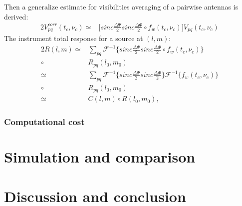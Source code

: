 Then a generalize estimate for visibilities averaging of a pairwise antennas is derived:
\begin{alignat*}{2}
 V_{pq}^{corr}(t_c, \nu_c)\simeq& \bigg[sinc\frac{\Delta \Psi}{2}sinc\frac{\Delta \Phi}{2}\circ f_{w}(t_c,\nu_c)\bigg]
			   V_{pq}(t_{c},\nu_{c})
\end{alignat*}
The  instrument total response for a source at $(l,m)$:
\begin{alignat*}{2}
R(l,m)\simeq& \sum_{pq}\mathcal{F}^{-1}\bigg\{sinc\frac{\Delta \Psi}{2}sinc\frac{\Delta \Phi}{2}\circ f_{w}(t_c,\nu_c)\bigg\}\\
	\circ& R_{pq}(l_0,m_0)\\
	\simeq& \sum_{pq}\mathcal{F}^{-1}\bigg\{sinc\frac{\Delta \Psi}{2}sinc\frac{\Delta 
\Phi}{2}\bigg\}\mathcal{F}^{-1}\bigg\{f_{w}(t_c,\nu_c)\bigg\}\\
	\circ& R_{pq}(l_0,m_0)\\
	\simeq& C(l,m)\circ R(l_0,m_0),
\end{alignat*}
\subsubsection{Computational cost}

\section{Simulation and comparison}
\section{Discussion and conclusion}